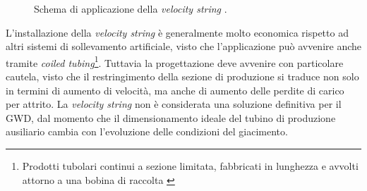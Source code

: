 \begin{figure}[htbp]
\centering
     \quad
    \caption{Schema di applicazione della \textit{velocity string} \parencite{arachman2004liquid}.} 
    \label{fig:velocitystring}
\end{figure}

L'installazione della \textit{velocity string} è generalmente molto economica rispetto ad altri sistemi di sollevamento artificiale, visto che l'applicazione può avvenire anche tramite \textit{coiled tubing}\footnote{Prodotti tubolari continui a sezione limitata, fabbricati in lunghezza e avvolti attorno a una bobina di raccolta \parencite{international2014introduction}}. Tuttavia la progettazione deve avvenire con particolare cautela, visto che il restringimento della sezione di produzione si traduce non solo in termini di aumento di velocità, ma anche di aumento delle perdite di carico per attrito. La \textit{velocity string} non è considerata una soluzione definitiva per il GWD, dal momento che il dimensionamento ideale del tubino di produzione ausiliario cambia con l'evoluzione delle condizioni del giacimento.

